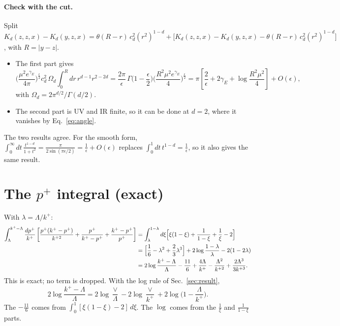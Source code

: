 \documentclass[10pt]{article}
\numberwithin{equation}{section}
\begin{document}
\paragraph{Check with the cut.} Split $K_d(z,z,x)-K_d(y,z,x)=\theta(R-r)\,c_d^2(r^2)^{1-d}+\big[K_d(z,z,x)-K_d(y,z,x)-\theta(R-r)\,c_d^2(r^2)^{1-d}\big]$, with $R=|y-z|$.
\begin{itemize}
\item The first part gives
\begin{equation}
\Big(\frac{\mu^2e^{\gamma_E}}{4\pi}\Big)^{\frac\epsilon2}c_d^2\,\Omega_d\int_0^Rdr\,r^{d-1}r^{2-2d}=\frac{2\pi}{\epsilon}\,\Gamma\Big(1-\frac\epsilon2\Big)\Big(\frac{R^2\mu^2e^{\gamma_E}}{4}\Big)^{\frac\epsilon2}=\pi\left[\frac2\epsilon+2\gamma_E+\log\frac{R^2\mu^2}{4}\right]+O(\epsilon),
\end{equation}
with $\Omega_d=2\pi^{d/2}/\Gamma(d/2)$.
\item The second part is UV and IR finite, so it can be done at $d=2$, where it vanishes by Eq.~\eqref{eq:angle}.
\end{itemize}
The two results agree. For the smooth form, $\int_0^\infty dt\,\frac{t^{1-d}}{1+t^2}=\frac{\pi}{2\sin(\pi\epsilon/2)}=\frac1\epsilon+O(\epsilon)$ replaces $\int_0^1dt\,t^{1-d}=\frac1\epsilon$, so it also gives the same result.

\section{The \texorpdfstring{$p^+$}{p+} integral (exact)}\label{sec:pplus}
With $\lambda=\Lambda/k^+$:
\begin{align}
\int_{\Lambda}^{k^+-\Lambda}\frac{dp^+}{k^+}\left[\frac{p^{+}(k^{+}-p^{+})}{k^{+2}}+\frac{p^{+}}{k^{+}-p^{+}}+\frac{k^{+}-p^{+}}{p^{+}}\right]
&=\int_\lambda^{1-\lambda}d\xi\Big[\xi(1-\xi)+\frac{1}{1-\xi}+\frac1\xi-2\Big]\notag\\
&=\Big[\frac16-\lambda^2+\frac23\lambda^3\Big]+2\log\frac{1-\lambda}{\lambda}-2(1-2\lambda)\notag\\
&=2\log\frac{k^+-\Lambda}{\Lambda}-\frac{11}{6}+\frac{4\Lambda}{k^+}-\frac{\Lambda^2}{k^{+2}}+\frac{2\Lambda^3}{3k^{+3}}.
\label{eq:xi}
\end{align}
This is exact; no term is dropped. With the log rule of Sec.~\ref{sec:result},
\begin{equation}
2\log\frac{k^+-\Lambda}{\Lambda}=2\log\frac{\vee}{\Lambda}-2\log\frac{\vee}{k^+}+2\log\Big(1-\frac{\Lambda}{k^+}\Big).
\end{equation}
The $-\frac{11}{6}$ comes from $\int_0^1[\xi(1-\xi)-2]\,d\xi$. The $\log$ comes from the $\frac1\xi$ and $\frac1{1-\xi}$ parts.
\end{document}
